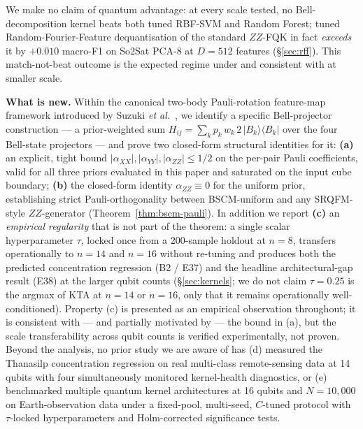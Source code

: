 \documentclass[pdflatex,sn-mathphys]{sn-jnl}
\theoremstyle{plain}
\theoremstyle{remark}
\theoremstyle{definition}
\begin{document}
\noindent We make no claim of quantum advantage: at every scale tested, no Bell-decomposition kernel beats both tuned RBF-SVM and Random Forest; tuned Random-Fourier-Feature dequantisation \cite{rahimi2007} of the standard $ZZ$-FQK in fact \emph{exceeds} it by $+0.010$ macro-F1 on So2Sat PCA-8 at $D=512$ features (\S\ref{sec:rff}). This match-not-beat outcome is the expected regime under \cite{canatar2022,florezablan2025} and consistent with \cite{bowles2024,schnabel2025,rodriguez2025} at smaller scale.

\medskip
\noindent\textbf{What is new.}
Within the canonical two-body Pauli-rotation feature-map framework introduced by Suzuki \emph{et al.}\ \cite{suzuki2020}, we identify a specific Bell-projector construction --- a prior-weighted sum $H_{ij}=\sum_k p_k\,w_k\,2\,|B_k\rangle\!\langle B_k|$ over the four Bell-state projectors --- and prove two closed-form structural identities for it: \textbf{(a)} an explicit, tight bound $|\alpha_{XX}|, |\alpha_{YY}|, |\alpha_{ZZ}| \le 1/2$ on the per-pair Pauli coefficients, valid for all three priors evaluated in this paper and saturated on the input cube boundary; \textbf{(b)} the closed-form identity $\alpha_{ZZ}\equiv 0$ for the uniform prior, establishing strict Pauli-orthogonality between BSCM-uniform and any SRQFM-style $ZZ$-generator (Theorem~\ref{thm:bscm-pauli}).  In addition we report \textbf{(c)} an \emph{empirical regularity} that is not part of the theorem: a single scalar hyperparameter $\tau$, locked once from a 200-sample holdout at $n=8$, transfers operationally to $n=14$ and $n=16$ without re-tuning and produces both the predicted concentration regression (B2 / E37) and the headline architectural-gap result (E38) at the larger qubit counts (\S\ref{sec:kernels}; we do not claim $\tau=0.25$ is the argmax of KTA at $n=14$ or $n=16$, only that it remains operationally well-conditioned).  Property (c) is presented as an empirical observation throughout; it is consistent with --- and partially motivated by --- the bound in (a), but the scale transferability across qubit counts is verified experimentally, not proven.  Beyond the analysis, no prior study we are aware of has (d) measured the Thanasilp \cite{thanasilp2024} concentration regression on real multi-class remote-sensing data at 14 qubits with four simultaneously monitored kernel-health diagnostics, or (e) benchmarked multiple quantum kernel architectures at 16 qubits and $N=10{,}000$ on Earth-observation data under a fixed-pool, multi-seed, $C$-tuned protocol with $\tau$-locked hyperparameters and Holm-corrected significance tests.
\end{document}
